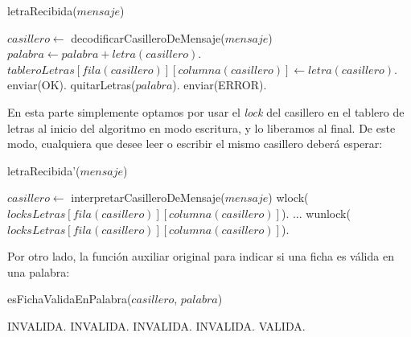 \begin{algorithm}[H]
\caption{letraRecibida($mensaje$)}
\begin{algorithmic}[1]
    \STATE $casillero \leftarrow$ decodificarCasilleroDeMensaje($mensaje$)
        \STATE $palabra \leftarrow palabra + letra(casillero)$.
        \STATE $tableroLetras[fila(casillero)][columna(casillero)] \leftarrow letra(casillero)$.
        \STATE enviar(OK).
    \ELSE
        \STATE quitarLetras($palabra$).
        \STATE enviar(ERROR).
    \ENDIF
\end{algorithmic}
\end{algorithm}

\noindent En esta parte simplemente optamos por usar el \emph{lock} del casillero en el tablero de letras al inicio del algoritmo en modo escritura, y lo liberamos al final. De este modo, cualquiera que desee leer o escribir el mismo casillero deberá esperar:

\begin{algorithm}[H]
\caption{letraRecibida'($mensaje$)}
\begin{algorithmic}[1]
    \STATE $casillero \leftarrow$ interpretarCasilleroDeMensaje($mensaje$)
    \STATE wlock($locksLetras[fila(casillero)][columna(casillero)]$).
    \STATE ...
    \STATE wunlock($locksLetras[fila(casillero)][columna(casillero)]$).
\end{algorithmic}
\end{algorithm}

Por otro lado, la función auxiliar original para indicar si una ficha es válida en una palabra:

\begin{algorithm}[H]
\caption{esFichaValidaEnPalabra($casillero$, $palabra$)}
\begin{algorithmic}[1]
        \RETURN INVALIDA.
    \ENDIF
        \RETURN INVALIDA.
    \ENDIF
                    \RETURN INVALIDA.
                \ENDIF
            \ENDFOR
        \ELSE
            \RETURN INVALIDA.
        \ENDIF
    \ENDIF
    \RETURN VALIDA.
\end{algorithmic}
\end{algorithm}

